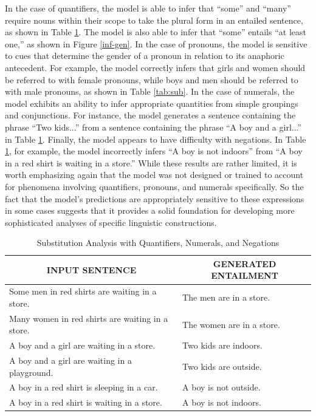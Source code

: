 In the case of quantifiers, the model is able to infer that ``some'' and ``many'' require nouns within their scope to take the plural form in an entailed sentence, as shown in Table \ref{tab:quantifiers}. The model is also able to infer that ``some'' entails ``at least one,'' as shown in Figure \ref{inf-gen}. In the case of pronouns, the model is sensitive to cues that determine the gender of a pronoun in relation to its anaphoric antecedent. For example, the model correctly infers that girls and women should be referred to with female pronouns, while boys and men should be referred to with male pronouns, as shown in Table \ref{tab:sub}. In the case of numerals, the model exhibits an ability to infer appropriate quantities from simple groupings and conjunctions. For instance, the model generates a sentence containing the phrase ``Two kids...'' from a sentence containing the phrase ``A boy and a girl...'' in Table \ref{tab:quantifiers}. Finally, the model appears to have difficulty with negations. In Table \ref{tab:quantifiers}, for example, the model incorrectly infers ``A boy is not indoors'' from ``A boy in a red shirt is waiting in a store.'' While these results are rather limited, it is worth emphasizing again that the model was not designed or trained to account for phenomena involving quantifiers, pronouns, and numerals specifically. So the fact that the model's predictions are appropriately sensitive to these expressions in some cases suggests that it provides a solid foundation for developing more sophisticated analyses of specific linguistic constructions. 

\begin{table}[!t]
\begin{center} 
\caption{Substitution Analysis with Quantifiers, Numerals, and Negations} 
\label{tab:quantifiers} 
\vskip 0.06in

\setlength{\tabcolsep}{13pt}
\begin{tabular}{ll} 
\hline

\multicolumn{1}{c}{\rule{0pt}{3ex} INPUT SENTENCE} & 
\multicolumn{1}{c}{GENERATED ENTAILMENT} \\

\hline
\rule{0pt}{3ex} Some men in red shirts are waiting in a store. & \quad The men are in a store. \\
Many women in red shirts are waiting in a store. & \quad The women are in a store. \\
A boy and a girl are waiting in a store. & \quad Two kids are indoors. \\
A boy and a girl are waiting in a playground. & \quad Two kids are outside. \\
A boy in a red shirt is sleeping in a car. & \quad A boy is not outside. \\
A boy in a red shirt is waiting in a store. & \quad A boy is not indoors. \\
\hline
\end{tabular}

\end{center} 
\end{table}

